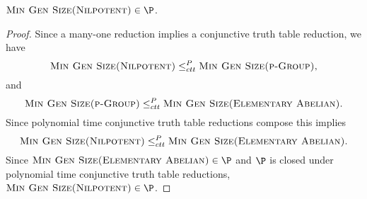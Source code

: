 \documentclass{article}
\begin{document}
\begin{theorem}
  $\textsc{Min Gen Size(Nilpotent)} \in \P$.
\end{theorem}
\begin{proof}
  Since a many-one reduction implies a conjunctive truth table reduction, we have
  \begin{equation*}
    \textsc{Min Gen Size(Nilpotent)} \leq_{ctt}^P \textsc{Min Gen Size(p-Group)},
  \end{equation*}
  and
  \begin{equation*}
    \textsc{Min Gen Size(p-Group)} \leq_{ctt}^P \textsc{Min Gen Size(Elementary Abelian)}.
  \end{equation*}
  Since polynomial time conjunctive truth table reductions compose this implies
  \begin{equation*}
    \textsc{Min Gen Size(Nilpotent)} \leq_{ctt}^P \textsc{Min Gen Size(Elementary Abelian)}.
  \end{equation*}
  Since $\textsc{Min Gen Size(Elementary Abelian)} \in \P$ and $\P$ is closed under polynomial time conjunctive truth table reductions, $\textsc{Min Gen Size(Nilpotent)} \in \P$.
\end{proof}
\end{document}
